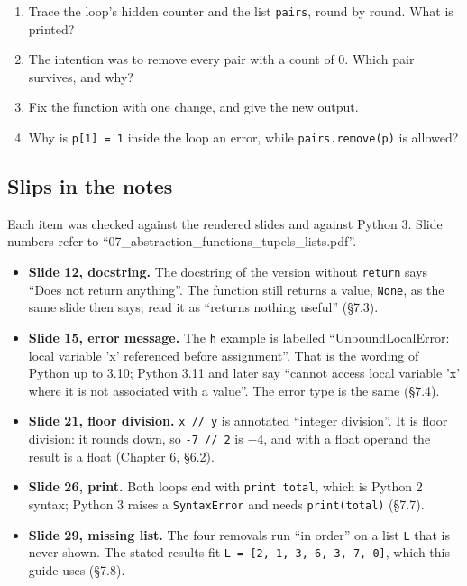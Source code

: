 \documentclass[11pt]{article}
\begin{document}
\begin{keepsection}
\begin{keepsection}
\begin{enumerate}
\item Trace the loop’s hidden counter and the list \texttt{pairs}, round by round. What is printed?
\item The intention was to remove every pair with a count of 0. Which pair survives, and why?
\item Fix the function with one change, and give the new output.
\item Why is \texttt{p[1] = 1} inside the loop an error, while \texttt{pairs.remove(p)} is allowed?
\end{enumerate}

\end{keepsection}
\end{keepsection}

\begin{keepsection}
\section{Slips in the notes}

Each item was checked against the rendered slides and against Python 3. Slide numbers refer to “07\_abstraction\_functions\_tupels\_lists.pdf”.

\begin{itemize}
\item \textbf{Slide 12, docstring.} The docstring of the version without \texttt{return} says “Does not return anything”. The function still returns a value, \texttt{None}, as the same slide then says; read it as “returns nothing useful” (§7.3).
\item \textbf{Slide 15, error message.} The \texttt{h} example is labelled “UnboundLocalError: local variable 'x' referenced before assignment”. That is the wording of Python up to 3.10; Python 3.11 and later say “cannot access local variable 'x' where it is not associated with a value”. The error type is the same (§7.4).
\item \textbf{Slide 21, floor division.} \texttt{x // y} is annotated “integer division”. It is floor division: it rounds down, so \texttt{-7 // 2} is \ensuremath{-}4, and with a float operand the result is a float (Chapter 6, §6.2).
\item \textbf{Slide 26, print.} Both loops end with \texttt{print total}, which is Python 2 syntax; Python 3 raises a \texttt{SyntaxError} and needs \texttt{print(total)} (§7.7).
\item \textbf{Slide 29, missing list.} The four removals run “in order” on a list \texttt{L} that is never shown. The stated results fit \texttt{L = [2, 1, 3, 6, 3, 7, 0]}, which this guide uses (§7.8).
\end{itemize}
\end{keepsection}
\end{document}
